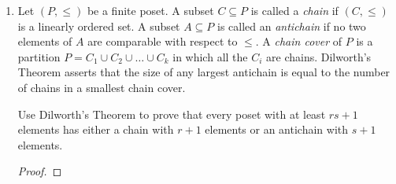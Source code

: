 \documentclass[12pt]{article}
\begin{document}
\begin{enumerate}
\begin{enumerate}
            \item There exists a lattice such that the following implication is not true:
            $$ x \leq z \Rightarrow  \forall y \; : \; x \vee (y \wedge z) = (x \vee y ) \wedge z$$
            
            \begin{proof}
                Consider the lattice $L$ given by the following Hasse diagram:
                
        \begin{center}
    \end{center}
            Notice that $y\wedge z = 0$, $x \vee y = 1$, $x \vee (y\wedge z) = x $, $(x \vee y)\wedge z = z$. In this lattice $x \neq z$. Therefore the equation does not hold.
            \end{proof}
            
            
        \end{enumerate}
        

    \item Let $(P, \leq)$ be a finite poset. A subset $C\subseteq P$ is called a \emph{chain} if $(C, \leq)$ is a linearly ordered set. A subset $A \subseteq P $ is called an \emph{antichain} if no two elements of $A $ are comparable with respect to $\leq$. A \emph{chain cover} of $P$ is a partition $P = C_1 \cup C_2 \cup \ldots \cup C_k$ in which all the $C_i$ are chains. Dilworth's Theorem asserts that the size of any largest antichain is equal to the number of chains in a smallest chain cover.
    
    Use Dilworth's Theorem to prove that every poset with at least $rs+1$ elements has either a chain with $r+1$ elements or an antichain with $s+1$ elements.
    
    \begin{proof}
    

\end{proof}
\end{enumerate}
\end{document}

